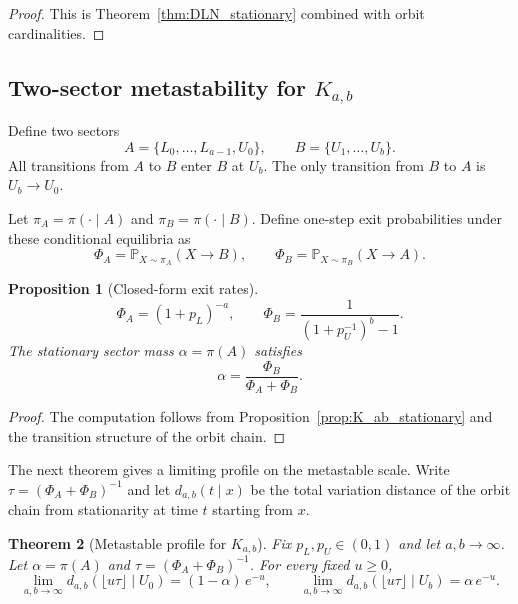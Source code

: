 \documentclass[final,3p,times]{elsarticle}
\newtheorem{theorem}{Theorem}[section]
\newtheorem{proposition}[theorem]{Proposition}
\theoremstyle{definition}
\newcommand{\PP}{\mathbb{P}}
\begin{document}
\begin{proof}
This is Theorem~\ref{thm:DLN_stationary} combined with orbit cardinalities.
\end{proof}

\subsection{Two-sector metastability for $K_{a,b}$}

Define two sectors
\[
A=\{L_0,\dots,L_{a-1},U_0\},\qquad B=\{U_1,\dots,U_b\}.
\]
All transitions from $A$ to $B$ enter $B$ at $U_b$.
The only transition from $B$ to $A$ is $U_b\to U_0$.

Let $\pi_A=\pi(\cdot\mid A)$ and $\pi_B=\pi(\cdot\mid B)$.
Define one-step exit probabilities under these conditional equilibria as
\[
\Phi_A = \PP_{X\sim\pi_A}(X\to B),
\qquad
\Phi_B = \PP_{X\sim\pi_B}(X\to A).
\]

\begin{proposition}[Closed-form exit rates]\label{prop:K_ab_exit_rates}
\[
\Phi_A = (1+p_L)^{-a},
\qquad
\Phi_B = \frac{1}{(1+p_U^{-1})^b-1}.
\]
The stationary sector mass $\alpha=\pi(A)$ satisfies
\[
\alpha = \frac{\Phi_B}{\Phi_A+\Phi_B}.
\]
\end{proposition}

\begin{proof}
The computation follows from Proposition~\ref{prop:K_ab_stationary} and the transition structure of the orbit chain.
\end{proof}

The next theorem gives a limiting profile on the metastable scale.
Write $\tau=(\Phi_A+\Phi_B)^{-1}$ and let $d_{a,b}(t\mid x)$ be the total variation distance of the orbit chain from stationarity at time $t$ starting from $x$.

\begin{theorem}[Metastable profile for $K_{a,b}$]\label{thm:K_ab_profile}
Fix $p_L,p_U\in(0,1)$ and let $a,b\to\infty$.
Let $\alpha=\pi(A)$ and $\tau=(\Phi_A+\Phi_B)^{-1}$.
For every fixed $u\ge 0$,
\[
\lim_{a,b\to\infty} d_{a,b}(\lfloor u\tau\rfloor\mid U_0) = (1-\alpha)\,e^{-u},
\qquad
\lim_{a,b\to\infty} d_{a,b}(\lfloor u\tau\rfloor\mid U_b) = \alpha\,e^{-u}.
\]
\end{theorem}
\end{document}
